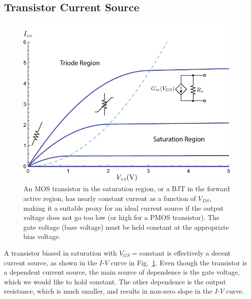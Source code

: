 \subsection{Transistor Current Source}
\begin{figure}[tb]
\centering
\includegraphics[width=.75\columnwidth]{mos_building_block.pdf}
\caption{An MOS transistor in the saturation region, or a BJT in the forward active region, has nearly constant current as a function of $V_{DS}$, making it a suitable proxy for an ideal current source if the output voltage does not go too low (or high for a PMOS transistor).  The gate voltage (base voltage) must be held constant at the appropriate bias voltage.}
\label{fig:mos_building_block.pdf}
\end{figure}
A transistor biased in saturation with $V_{GS} = \text{constant}$ is effectively a decent current source, as shown in the $I$-$V$ curve in Fig.~\ref{fig:mos_building_block.pdf}.  Even though the transistor is a dependent current source, the main source of dependence is the gate voltage, which we would like to hold constant.  The other dependence is the output resistance, which is much smaller, and results in non-zero slope in the $I$-$V$ curve. 
